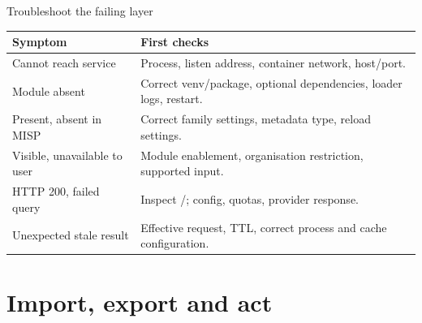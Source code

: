 \begin{frame}{Troubleshoot the failing layer}
    \small
    \begin{tabular}{P{3.2cm}P{7cm}}
        \toprule
        Symptom & First checks \\
        \midrule
        Cannot reach service & Process, listen address, container network, host/port. \\
        Module absent & Correct venv/package, optional dependencies, loader logs, restart. \\
        Present, absent in MISP & Correct family settings, metadata type, reload settings. \\
        Visible, unavailable to user & Module enablement, organisation restriction, supported input. \\
        HTTP 200, failed query & Inspect /; config, quotas, provider response. \\
        Unexpected stale result & Effective request, TTL, correct process and cache configuration. \\
        \bottomrule
    \end{tabular}
\end{frame}

\section{Import, export and act}

